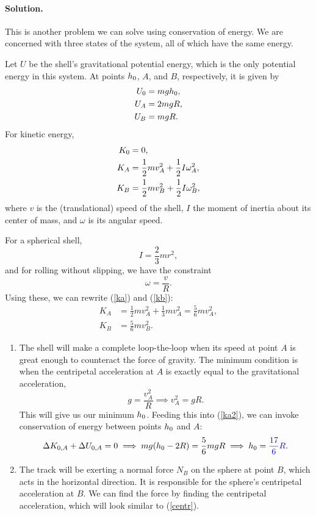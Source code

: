 \documentclass[11pt]{article}
\newcommand{\refeq}[1]{(\ref{#1})}
\newcommand{\beq}{\begin{equation*}}
\newcommand{\eeq}{\end{equation*}}
\newcommand{\beqn}{\begin{equation}}
\newcommand{\eeqn}{\end{equation}}
\newenvironment{solution}
{
    \paragraph{Solution.}
    \ignorespaces
}
{
    \bigskip
}
\begin{document}
\begin{solution}
	This is another problem we can solve using conservation of energy.  We are concerned with three states of the system, all of which have the same energy.
	
	Let $U$ be the shell's gravitational potential energy, which is the only potential energy in this system.  At points $h_0$, $A$, and $B$, respectively, it is given by
	\begin{align*}
		U_0 &= m g h_0, \\
		U_A &= 2 m g R, \\
		U_B &= m g R.
	\end{align*}
	For kinetic energy,
	\begin{align}
		K_0 &= 0, \notag \\
		K_A &= \frac{1}{2} m v_A^2 + \frac{1}{2} I \omega_A^2, \label{ka} \\
		K_B &= \frac{1}{2} m v_B^2 + \frac{1}{2} I \omega_B^2, \label{kb}
	\end{align}
	where $v$ is the (translational) speed of the shell, $I$ the moment of inertia about its center of mass, and $\omega$ is its angular speed.
	
	For a spherical shell,
	\beq
		I = \frac{2}{3} m r^2,
	\eeq
	and for rolling without slipping, we have the constraint
	\beq
		\omega = \frac{v}{R}.
	\eeq
	Using these, we can rewrite \refeq{ka} and \refeq{kb}:
	\begin{align}
		K_A &= \frac{1}{2} m v_A^2 + \frac{1}{3} m v_A^2 = \frac{5}{6} m v_A^2, \label{ka2} \\
		K_B &= \frac{5}{6} m v_B^2. \label{kb2}
	\end{align}
	
	\begin{enumerate}
		\item The shell will make a complete loop-the-loop when its speed at point $A$ is great enough to counteract the force of gravity.  The minimum condition is when the centripetal acceleration at $A$ is exactly equal to the gravitational acceleration,
			\beqn \label{centr}
				g = \frac{v_A^2}{R} \implies v_A^2 = g R.
			\eeqn
			This will give us our minimum $h_0$.  Feeding this into \refeq{ka2}, we can invoke conservation of energy between points $h_0$ and $A$:
			\beq
				\Delta K_{0,A} + \Delta U_{0,A} = 0 \implies mg (\ho - 2R) = \frac{5}{6} mg R \implies \ho = {\color{blue} \frac{17}{6} R}.
			\eeq
		
		\item The track will be exerting a normal force $N_B$ on the sphere at point $B$, which acts in the horizontal direction.  It is responsible for the sphere's centripetal acceleration at $B$.  We can find the force by finding the centripetal acceleration, which will look similar to \refeq{centr}.
		

\end{enumerate}
\end{solution}
\end{document}
